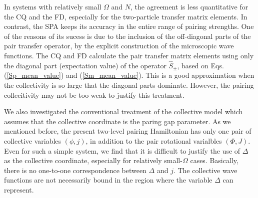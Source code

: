 \documentclass[%
superscriptaddress,
preprint,
showpacs,
nofootinbib,
amsmath,amssymb,
prc,
floatfix ]%
{revtex4-1}
\begin{document}
In systems with relatively small $\Omega$ and $N$,
the agreement is less quantitative for the CQ and the FD,
especially for the two-particle transfer matrix elements.
In contrast, the SPA keeps its accuracy in the entire range of
pairing strengths.
One of the reasons of its sucess is due to the inclusion of the off-diagonal 
parts of the pair transfer operator,
by the explicit construction of the microscopic wave functions.
The CQ and FD calculate the pair transfer matrix elements using only
the diagonal part (expectation value) of the operator $\hat{S}_\pm$,
based on Eqs. (\ref{Sp_mean_value}) and (\ref{Sm_mean_value}).
This is a good approximation when the collectivity is so large that the
diagonal parts dominate.
However, the pairing collecitivity may not be too weak to justify this
treatment.


We also investigated the conventional treatment of
the collective model which assumes that the collective coordinate is
the paring gap parameter.
As we mentioned before, the present two-level pairing Hamiltonian has
only one pair of collective variables $(\phi,j)$, in addition to the
pair rotational varialbles $(\Phi,J)$.
Even for such a simple system, we find that it is difficult to justify
the use of $\Delta$ as the collective coordinate,
especially for relatively small-$\Omega$ cases.
Basically, there is no one-to-one correspondence between $\Delta$ and $j$.
The collective wave functions are not necessarily bound in the region
where the variable $\Delta$ can represent.
\end{document}
